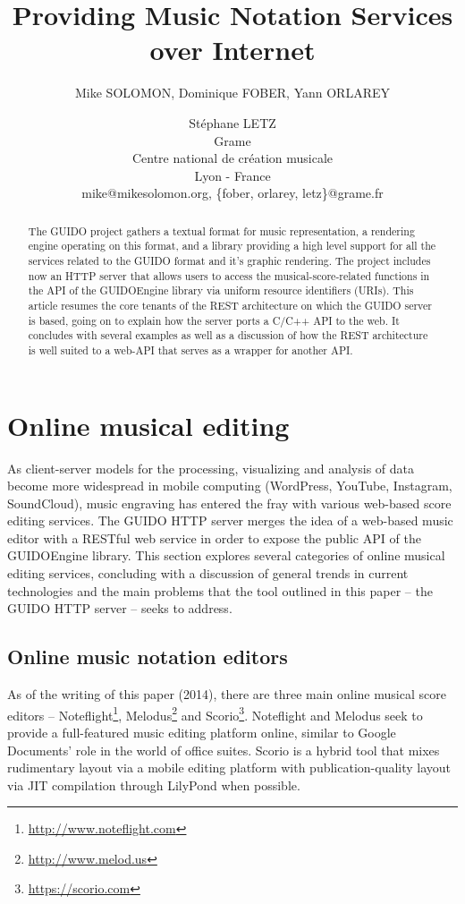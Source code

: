\documentclass[11pt,a4paper]{article}
\title{Providing Music Notation Services over Internet}
\author
{Mike SOLOMON, Dominique FOBER, Yann ORLAREY \and Stéphane LETZ
\\ Grame
\\ Centre national de création musicale
\\ Lyon - France 
\\ mike@mikesolomon.org, \{fober, orlarey, letz\}@grame.fr 
}
\date{}
\newcommand{\footurl}[1]	{\footnote{\url{#1}}}
\begin{document}
\maketitle

\begin{abstract}

The GUIDO project gathers a textual format for music representation, a rendering engine operating on this format, and a library providing a high level support for all the services related to the GUIDO format and it's graphic rendering. The project includes now an HTTP server that allows users to access the musical-score-related functions in the API of the GUIDOEngine library via uniform resource identifiers (URIs).  This article resumes the core tenants of the REST architecture on which the GUIDO server is based, going on to explain how the server ports a C/C++ API to the web.  It concludes with several examples as well as a discussion of how the REST architecture is well suited to a web-API that serves as a wrapper for another API.
\end{abstract}

\section{Online musical editing}\label{section:online-musical-editing}
As client-server models for the processing, visualizing and analysis of data become more widespread in mobile computing (WordPress, YouTube, Instagram, SoundCloud), music engraving has entered the fray with various web-based score editing services.  The GUIDO HTTP server merges the idea of a web-based music editor with a RESTful web service in order to expose the public API of the GUIDOEngine library\cite{guido}. This section explores several categories of online musical editing services, concluding with a discussion of general trends in current technologies and the main problems that the tool outlined in this paper -- the GUIDO HTTP server -- seeks to address.
\subsection{Online music notation editors}\label{subsection:editor}
As of the writing of this paper (2014), there are three main online musical score editors -- Noteflight\footurl{http://www.noteflight.com}, Melodus\footurl{http://www.melod.us} and Scorio\footurl{https://scorio.com}.  Noteflight and Melodus seek to provide a full-featured music editing platform online, similar to Google Documents' role in the world of office suites.  Scorio is a hybrid tool that mixes rudimentary layout via a mobile editing platform with publication-quality layout via JIT compilation through LilyPond when possible.
\end{document}
